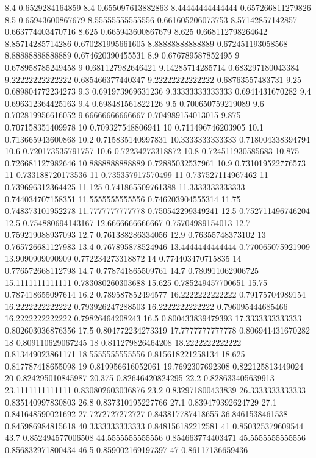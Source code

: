 {8.4 0.6529284164859
8.4 0.655097613882863
8.44444444444444 0.657266811279826
8.5 0.65943600867679
8.55555555555556 0.661605206073753
8.57142857142857 0.663774403470716
8.625 0.665943600867679
8.625 0.668112798264642
8.85714285714286 0.670281995661605
8.88888888888889 0.672451193058568
8.88888888888889 0.674620390455531
8.9 0.676789587852495
9 0.678958785249458
9 0.681127982646421
9.14285714285714 0.683297180043384
9.22222222222222 0.685466377440347
9.22222222222222 0.68763557483731
9.25 0.689804772234273
9.3 0.691973969631236
9.33333333333333 0.6941431670282
9.4 0.696312364425163
9.4 0.698481561822126
9.5 0.700650759219089
9.6 0.702819956616052
9.66666666666667 0.704989154013015
9.875 0.707158351409978
10 0.709327548806941
10 0.711496746203905
10.1 0.713665943600868
10.2 0.715835140997831
10.3333333333333 0.718004338394794
10.6 0.720173535791757
10.6 0.72234273318872
10.8 0.724511930585683
10.875 0.726681127982646
10.8888888888889 0.72885032537961
10.9 0.731019522776573
11 0.733188720173536
11 0.735357917570499
11 0.737527114967462
11 0.739696312364425
11.125 0.741865509761388
11.3333333333333 0.744034707158351
11.5555555555556 0.746203904555314
11.75 0.748373101952278
11.7777777777778 0.750542299349241
12.5 0.752711496746204
12.5 0.754880694143167
12.6666666666667 0.75704989154013
12.7 0.759219088937093
12.7 0.761388286334056
12.9 0.76355748373102
13 0.765726681127983
13.4 0.767895878524946
13.4444444444444 0.770065075921909
13.9090909090909 0.772234273318872
14 0.774403470715835
14 0.776572668112798
14.7 0.778741865509761
14.7 0.780911062906725
15.1111111111111 0.783080260303688
15.625 0.785249457700651
15.75 0.787418655097614
16.2 0.789587852494577
16.2222222222222 0.79175704989154
16.2222222222222 0.793926247288503
16.2222222222222 0.796095444685466
16.2222222222222 0.79826464208243
16.5 0.800433839479393
17.3333333333333 0.802603036876356
17.5 0.804772234273319
17.7777777777778 0.806941431670282
18 0.809110629067245
18 0.811279826464208
18.2222222222222 0.813449023861171
18.5555555555556 0.815618221258134
18.625 0.817787418655098
19 0.819956616052061
19.7692307692308 0.822125813449024
20 0.824295010845987
20.375 0.82646420824295
22.2 0.828633405639913
23.1111111111111 0.830802603036876
23.2 0.832971800433839
26.3333333333333 0.835140997830803
26.8 0.837310195227766
27.1 0.839479392624729
27.1 0.841648590021692
27.7272727272727 0.843817787418655
36.8461538461538 0.845986984815618
40.3333333333333 0.848156182212581
41 0.850325379609544
43.7 0.852494577006508
44.5555555555556 0.854663774403471
45.5555555555556 0.856832971800434
46.5 0.859002169197397
47 0.86117136659436
}
